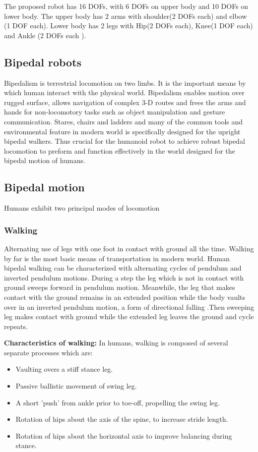 \documentclass[12pt]{article}
\begin{document}
The proposed robot has 16 DOFs, with 6 DOFs on upper body and 10
DOFs on lower body. The upper body has 2 arms with
shoulder(2 DOFs each) and elbow (1 DOF each). Lower body has 2
legs with Hip(2 DOFs each), Knee(1 DOF each) and Ankle (2 DOFs each ).


\subsection{Bipedal robots}
Bipedalism is terrestrial locomotion on two limbs. It is the important
means by which human interact with the physical world. Bipedalism enables motion over
rugged surface, allows navigation of complex 3-D routes and frees the arms and hands for
non-locomotory tasks such as object manipulation and gesture communication. Stares,
chairs and ladders and many of the common tools and environmental feature in modern
world is specifically designed for the upright bipedal walkers. Thus crucial for the
humanoid robot to achieve robust bipedal locomotion to preform and function effectively
in the world designed for the bipedal motion of humans.
\\


\subsection{Bipedal motion}
Humans exhibit two principal modes of locomotion

\subsubsection{Walking}
Alternating use of legs with one foot in contact with ground all the time.   Walking by far is the most basic means of transportation in modern world. Human bipedal walking can be characterized with alternating cycles of pendulum and inverted pendulum motions. During a step the leg which is not in contact with ground sweeps forward in pendulum motion. Meanwhile, the leg that makes contact with the ground remains in an extended position while the body vaults over in an inverted pendulum motion, a form of directional falling .Then sweeping leg makes contact with ground while the extended leg leaves the ground and cycle repeats.

\textbf{Characteristics of walking:} In humans, walking is composed of several separate processes which are:
\begin{itemize}
\setlength{\itemsep}{1pt}
\item Vaulting overs a stiff stance leg.
\item Passive ballistic movement of swing leg.
\item A short 'push' from ankle prior to toe-off, propelling the swing leg.
\item Rotation of hips about the axis of the spine, to increase stride length.
\item Rotation of hips about the horizontal axis to improve balancing during stance.

\end{itemize}
	
\end{document}
